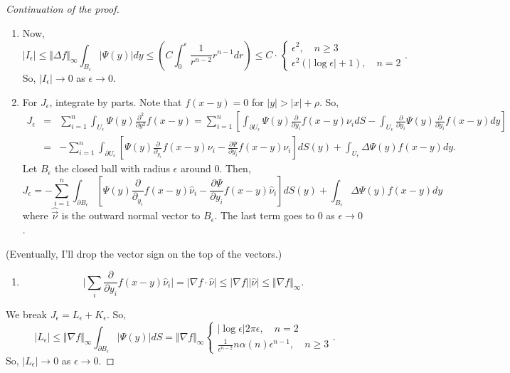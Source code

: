 \documentclass[11pt]{amsart}%
\begin{document}
\begin{proof}[Continuation of the proof]
\begin{enumerate}
\def\labelenumi{(\roman{enumi})}
\item
  Now,
  \[\vert I_\epsilon\vert \le \Vert \Delta f\Vert_\infty \int_{B_\epsilon}|\Psi(y)\vert dy \le (C\int_0^\epsilon \frac{1}{r^{n-2}}r^{n-1}dr)\le C\cdot \begin{cases} \epsilon^2, \quad n\ge 3\\
            \epsilon^2(\vert \log \epsilon\vert +1), \quad n=2
            \end{cases}.\] So, \(\vert I_\epsilon \vert \to 0\) as
  \(\epsilon\to 0\).
\item
  For \(J_\epsilon\), integrate by parts. Note that \(f(x-y)=0\) for
  \(\vert y\vert > \vert x\vert +\rho\). So,
  \begin{eqnarray*}
  J_\epsilon &=& \sum_{i=1}^n \int_{U_\epsilon} \Psi(y)\frac{\partial^2}{\partial y^2} f(x-y) = \sum_{i=1}^n[\int_{\partial U_\epsilon} \Psi(y)\frac{\partial}{\partial y_i}f(x-y)\nu_i dS -\int_{U_\epsilon}\frac{\partial}{\partial y_i} \Psi(y) \frac{\partial}{\partial y_i}f(x-y)dy]\\
  &=&-\sum_{i=1}^n \int_{\partial U_\epsilon}[\Psi(y)\frac{\partial}{\partial_{y_i}}f(x-y)\nu_i -\frac{\partial \Psi}{\partial y_i}f(x-y)\nu_i]dS(y) +\int_{U_\epsilon}\Delta \Psi(y)f(x-y)dy.
  \end{eqnarray*}
  Let \(B_\epsilon\) the closed ball with radius \(\epsilon\) around
  \(0\). Then,
  \[J_\epsilon=-\sum_{i=1}^n \int_{\partial B_\epsilon}[\Psi(y)\frac{\partial}{\partial_{y_i}}f(x-y)\hat{\nu}_i -\frac{\partial \Psi}{\partial y_i}f(x-y)\hat{\nu}_i]dS(y) +\int_{B_\epsilon}\Delta \Psi(y)f(x-y)dy\]
  where \(\hat{\vec{\nu}}\) is the outward normal vector to
  \(B_\epsilon\). The last term goes to \(0\) as \(\epsilon\to 0\).
\end{enumerate}

(Eventually, I'll drop the vector sign on the top of the vectors.)

\begin{enumerate}
\def\labelenumi{(\roman{enumi})}
\setcounter{enumi}{2}

\item
  \[\vert \sum_i \frac{\partial}{\partial y_i}f(x-y) \hat{\nu}_i\vert =\vert \nabla f\cdot \hat{\nu}\vert \le \vert \nabla f\vert \vert \hat{\nu}\vert \le \Vert \nabla f\Vert_\infty.\]
\end{enumerate}

We break \(J_\epsilon=L_\epsilon + K_\epsilon\). So,
$$\vert L_\epsilon \vert \le \Vert \nabla f\Vert_\infty \int_{\partial B_\epsilon}\vert \Psi(y)\vert dS =\Vert \nabla f\Vert_\infty\begin{cases} \vert \log \epsilon\vert 2\pi\epsilon, \quad n=2\\ \frac{1}{\epsilon^{n-2}}n\alpha(n)\epsilon^{n-1}, \quad n\ge 3 \end{cases}.$$
So, \(\vert L_\epsilon \vert\to 0\) as \(\epsilon\to 0\).


\end{proof}
\end{document}
